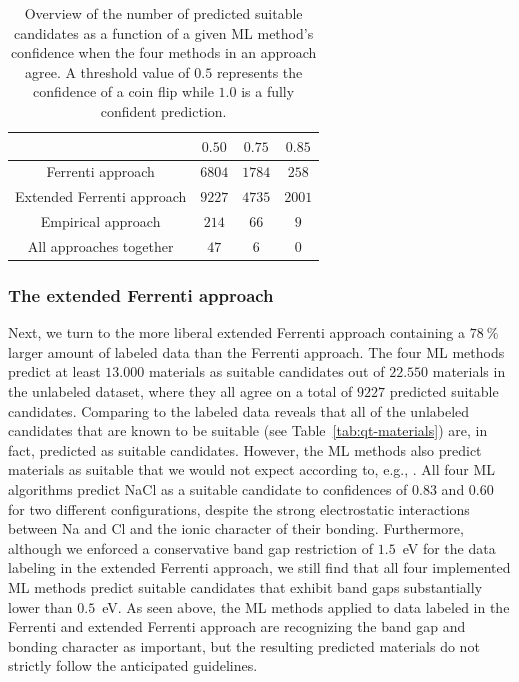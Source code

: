 \documentclass[superscriptaddress,unsortedaddress,
 amsmath,amssymb,
 aps,
]{revtex4-2}
\begin{document}
\begin{table}[t]
    \centering 
    \caption{Overview of the number of predicted suitable candidates as a function of a given ML method's confidence when the four methods in an approach agree. A threshold value of $0.5$ represents the confidence of a coin flip while $1.0$ is a fully confident prediction.}
    \begin{tabular}{c|c|c|c}
      & $0.50$ & $0.75$ & $0.85$ \\
     \hline
     Ferrenti approach &  $6804$ & $1784$ & $258$  \\
     Extended Ferrenti approach &  $9227$ & $4735$  & $2001$  \\ 
     Empirical approach & $214$ & $66$ & $9$ \\
     \hline
     All approaches together & $47$ & $6$ & 0 \\
    \end{tabular}
    \label{tab:probabilites}
\end{table} 


\subsubsection*{The extended Ferrenti approach}
Next, we turn to the more liberal extended Ferrenti approach containing a $78 \ \%$ larger 
amount of labeled data than the Ferrenti approach.  
The four ML methods predict at least $13.000$ materials as suitable candidates out of $22.550$ materials in the unlabeled dataset, where they all agree on a total of $9227$ predicted suitable candidates. Comparing to the labeled data reveals that all of the unlabeled candidates that are known to be suitable (see Table~\ref{tab:qt-materials}) are, in fact, predicted as suitable candidates. 
However, the ML methods also predict materials as suitable that we would not expect according to, e.g., \citeauthor{Weber2010} \cite{Weber2010}. 
All four ML algorithms predict NaCl as a suitable candidate to confidences of $0.83$ and $0.60$ for two different configurations, despite the strong electrostatic interactions between Na and Cl and the ionic character of their bonding.  
Furthermore, although we enforced a conservative band gap restriction of $1.5$~eV for the data labeling in the extended Ferrenti approach, we still find that all four implemented ML methods predict suitable candidates that exhibit band gaps substantially lower than $0.5$~eV.  
As seen above, the ML methods applied to data labeled in the Ferrenti and extended Ferrenti approach are recognizing the band gap and bonding character as important, but the resulting predicted materials do not strictly follow the anticipated guidelines. 
 
\end{document}
